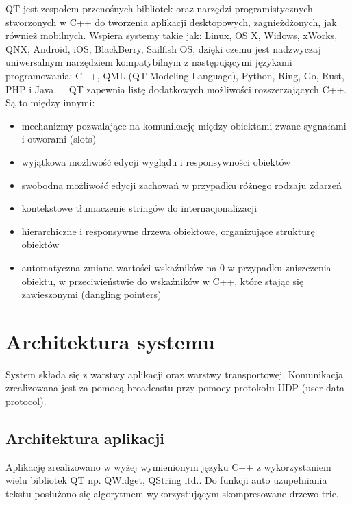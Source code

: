 \documentclass[twoside,a4paper]{book}
\begin{document}
QT jest zespołem przenośnych bibliotek oraz narzędzi programistycznych stworzonych w C++ do tworzenia aplikacji desktopowych, zagnieżdżonych, jak również mobilnych. Wspiera systemy takie jak: Linux, OS X, Widows, xWorks, QNX, Android, iOS, BlackBerry, Sailfish OS, dzięki czemu jest nadzwyczaj uniwersalnym narzędziem kompatybilnym z następującymi językami programowania: C++, QML (QT Modeling Language), Python, Ring, Go, Rust, PHP i Java.~\cite{qtAbout}~\cite{qtLang}
QT zapewnia listę dodatkowych możliwości rozszerzających C++. Są to między innymi: \begin{itemize}
\item mechanizmy pozwalające na komunikację między obiektami zwane sygnałami i otworami (slots)
\item wyjątkowa możliwość edycji wyglądu i responsywności obiektów 
\item swobodna możliwość edycji zachowań w przypadku różnego rodzaju zdarzeń 
\item kontekstowe tłumaczenie stringów do internacjonalizacji
\item hierarchiczne i responsywne drzewa obiektowe, organizujące strukturę obiektów
\item automatyczna zmiana wartości wskaźników na 0 w przypadku zniszczenia obiektu, w przeciwieństwie do wskaźników w C++, które stając się zawieszonymi (dangling pointers) 
~\cite{qtLang}
\end{itemize}

\section{Architektura systemu}
System składa się z warstwy aplikacji oraz warstwy transportowej. Komunikacja zrealizowana jest za pomocą broadcastu przy pomocy protokołu UDP (user data protocol). 

\subsection{Architektura aplikacji}
Aplikację zrealizowano w wyżej wymienionym języku C++ z wykorzystaniem wielu bibliotek QT np. QWidget, QString itd.. Do funkcji auto uzupełniania tekstu posłużono się algorytmem wykorzystującym skompresowane drzewo trie. 
\end{document}
